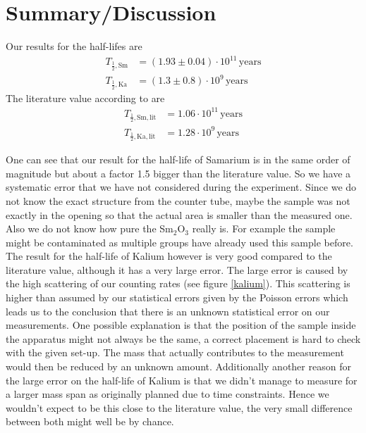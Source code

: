 \documentclass[12pt]{article}
\begin{document}
\section{Summary/Discussion}
Our results for the half-lifes are
\begin{align*}
	T_{\frac12,\text{Sm}}&=\left(1.93\pm0.04\right)\cdot10^{11}\,\text{years}\\
	T_{\frac12,\text{Ka}}&=\left(1.3 \pm0.8 \right)\cdot10^{9} \,\text{years}
\end{align*}
The literature value according to \cite{anleitung} are
\begin{align*}
	T_{\frac12,\text{Sm},\text{lit}}&=1.06\cdot10^{11}\,\text{years}\\
	T_{\frac12,\text{Ka},\text{lit}}&=1.28\cdot10^{9} \,\text{years}
\end{align*}

One can see that our result for the half-life of Samarium is in the same order of magnitude but about a factor 1.5 bigger than the literature value. So we have a systematic error that we have not considered during the experiment. Since we do not know the exact structure from the counter tube, maybe the sample was not exactly in the opening so that the actual area is smaller than the measured one.\\
Also we do not know how pure the Sm$_2$O$_3$ really is. For example the sample might be contaminated as multiple groups have already used this sample before.\\

The result for the half-life of Kalium however is very good compared to the literature value, although it has a very large error. The large error is caused by the high scattering of our counting rates (see figure \ref{kalium}). This scattering is higher than assumed by our statistical errors given by the Poisson errors which leads us to the conclusion that there is an unknown statistical error on our measurements. One possible explanation is that the position of the sample inside the apparatus might not always be the same, a correct placement is hard to check with the given set-up. The mass that actually contributes to the measurement would then be reduced by an unknown amount. 
Additionally another reason for the large error on the half-life of Kalium is that we didn't manage to measure for a larger mass span as originally planned due to time constraints. Hence we wouldn't expect to be this close to the literature value, the very small difference between both might well be by chance.
\end{document}
